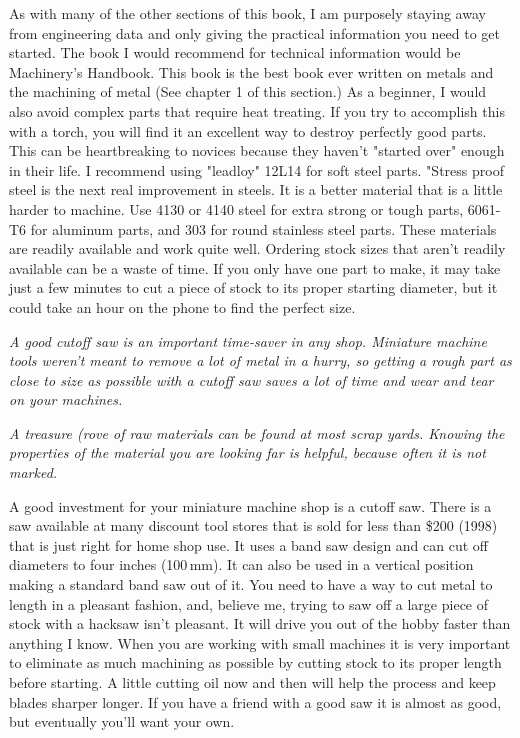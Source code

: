 \secdown


As with many of the other sections of this book, I am purposely staying away
from engineering data and only giving the practical information you need to get
started. The book I would recommend for technical information would be
Machinery's Handbook. This book is the best book ever written on metals and the
machining of metal (See chapter 1 of this section.) As a beginner, I would also
avoid complex parts that require heat treating. If you try to accomplish this
with a torch, you will find it an excellent way to destroy perfectly good parts.
This can be heartbreaking to novices because they haven't "started over" enough
in their life. I recommend using "leadloy" 12L14 for soft steel parts. "Stress
proof steel is the next real improvement in steels. It is a better material that
is a little harder to machine. Use 4130 or 4140 steel for extra strong or tough
parts, 6061-T6 for aluminum parts, and 303 for round stainless steel parts.
These materials are readily available and work quite well. Ordering stock sizes
that aren't readily available can be a waste of time. If you only have one part
to make, it may take just a few minutes to cut a piece of stock to its proper
starting diameter, but it could take an hour on the phone to find the perfect
size.

\bigskip
\textit{A good cutoff saw is an important time-saver in any shop. Miniature
machine tools weren't meant to remove a lot of metal in a hurry, so getting a
rough part as close to size as possible with a cutoff saw saves a lot of time
and wear and tear on your machines.}

\bigskip

\textit{A treasure (rove of raw materials can be found at most scrap yards.
Knowing the properties of the material you are looking far is helpful, because
often it is not marked.}
\bigskip


A good investment for your miniature machine shop is a cutoff saw. There is a
saw available at many discount tool stores that is sold for less than \$200
(1998) that is just right for home shop use. It uses a band saw design and can
cut off diameters to four inches (100\,mm). It can also be used in a vertical
position making a standard band saw out of it. You need to have a way to cut
metal to length in a pleasant fashion, and, believe me, trying to saw off a
large piece of stock with a hacksaw isn't pleasant. It will drive you out of the
hobby faster than anything I know. When you are working with small machines it
is very important to eliminate as much machining as possible by cutting stock to
its proper length before starting. A little cutting oil now and then will help
the process and keep blades sharper longer. If you have a friend with a good saw
it is almost as good, but eventually you'll want your own.

